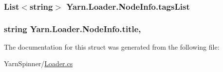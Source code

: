 \hypertarget{a00112_ab5010cc4c731e0da871e6002e5fb99a1}{
\subsubsection[{tags\-List}]{\setlength{\rightskip}{0pt plus 5cm}List$<$string$>$ Yarn.\-Loader.\-Node\-Info.\-tags\-List\hspace{0.3cm}{\ttfamily [get]}}}\label{a00112_ab5010cc4c731e0da871e6002e5fb99a1}
\hypertarget{a00112_aafc45bbc86a9acb9bdbcf7877695a96c}{
\subsubsection[{title}]{\setlength{\rightskip}{0pt plus 5cm}string Yarn.\-Loader.\-Node\-Info.\-title\hspace{0.3cm}{\ttfamily [get]}, {\ttfamily [set]}}}\label{a00112_aafc45bbc86a9acb9bdbcf7877695a96c}


The documentation for this struct was generated from the following file\-:\begin{DoxyCompactItemize}
\item 
Yarn\-Spinner/\hyperlink{a00265}{Loader.\-cs}\end{DoxyCompactItemize}

